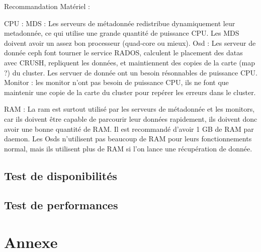 \documentclass{article}
\begin{document}
	Recommandation Matériel :
	
	CPU :
	MDS : Les serveurs de métadonnée redistribue dynamiquement leur metadonnée, ce qui utilise une grande quantité de puissance CPU. Les MDS doivent avoir un assez bon processeur (quad-core ou mieux).
	Osd : Les serveur de donnée ceph font tourner le service RADOS, calculent le placement des datas avec CRUSH, repliquent les données, et maintiennent des copies de la carte (map ?) du cluster. Les servuer de donnée ont un besoin résonnables de puissance CPU.
	Monitor : les monitor n'ont pas besoin de puissance CPU, ils ne font que maintenir une copie de la carte du cluster pour repérer les erreurs dans le cluster.
	
	RAM :
	La ram est surtout utilisé par les serveurs de métadonnée et les monitors, car ils doivent être capable de parcourir leur données rapidement, ils doivent donc avoir une bonne quantité de RAM. Il est recommandé d'avoir 1 GB de RAM par daemon.
	Les Osds n'utilisent pas beaucoup de RAM pour leurs fonctionnements normal, mais ils utilisent plus de RAM si l'on lance une récupération de donnée.
	
	
	\subsection{Test de disponibilités}
	\subsection{Test de performances}
	
	
  \section{Annexe}
 
\end{document}
